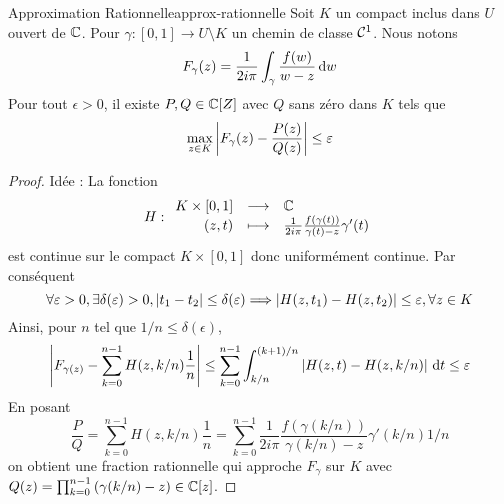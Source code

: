 \documentclass{cours}
\begin{document}
\begin{lemme}{Approximation Rationnelle}{approx-rationnelle}
    Soit $K$ un compact inclus dans $U$ ouvert de $\mathbb{C}$. Pour $\gamma : [0, 1] \to U \setminus K$ un chemin de classe $\mathcal{C}^{1}$. Nous notons 
    \[
        F_{\gamma}(z) = \frac{1}{2i\pi}\int_{\gamma}\frac{f(w)}{w-z}{\rm \, d} w
    \]
    Pour tout $\epsilon > 0$, il existe $P, Q \in \mathbb{C}[Z]$ avec $Q$ sans zéro dans $K$ tels que 
    \[
        \max_{z \in K} \left|F_{\gamma}(z) - \frac{P(z)}{Q(z)}\right| \leq \varepsilon
    \]
\end{lemme}
\begin{proof}
    Idée : La fonction 
    \[
        H : \begin{array}{rcl}
            K \times [0, 1] & \longrightarrow & \mathbb{C}\\
            (z, t) & \longmapsto & \frac{1}{2i\pi}\frac{f(\gamma(t))}{\gamma(t) - z}\gamma'(t)
        \end{array}
    \]
    est continue sur le compact $K \times [0, 1]$ donc uniformément continue. Par conséquent
    \[
        \forall \varepsilon > 0, \exists \delta(\varepsilon) > 0, \left|t_{1} - t_{2}\right| \leq \delta(\varepsilon) \Longrightarrow \left|H(z, t_{1}) - H(z, t_{2})\right| \leq \varepsilon, \forall z \in K
    \]
    Ainsi, pour $n$ tel que $1/n \leq \delta(\epsilon)$, 
    \[
        \left|F_{\gamma(z)} - \sum_{k = 0}^{n - 1} H(z, k/n)\frac{1}{n}\right| \leq \sum_{k = 0}^{n - 1}\int_{k/n}^{(k + 1)/n}\left|H(z, t) - H(z, k/n)\right|{\rm \, d} t \leq \varepsilon
    \]
    En posant 
    \[
        \frac{P}{Q} = \sum_{k = 0}^{n - 1}H(z, k/n)\frac{1}{n} = \sum_{k = 0}^{n - 1}\frac{1}{2i\pi}\frac{f(\gamma(k/n))}{\gamma(k/n) - z}\gamma'(k/n)1/n
    \]
    on obtient une fraction rationnelle qui approche $F_{\gamma}$ sur $K$ avec $Q(z) = \prod_{k = 0}^{n - 1}\left(\gamma(k/n) - z\right) \in \mathbb{C}[z]$.
\end{proof}
\end{document}
